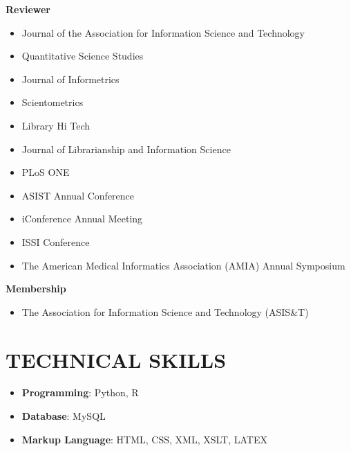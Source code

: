 \documentclass[margin, 10pt]{res} %
\begin{document}
\begin{resume}
\textbf{Reviewer}
\begin{itemize}
\item Journal of the Association for Information Science and Technology
\item Quantitative Science Studies
\item Journal of Informetrics
\item Scientometrics
\item Library Hi Tech
\item Journal of Librarianship and Information Science
\item PLoS ONE
\item ASIST Annual Conference
\item iConference Annual Meeting
\item ISSI Conference
\item The American Medical Informatics Association (AMIA) Annual Symposium
\end{itemize}

\textbf{Membership}
\begin{itemize}
\item The Association for Information Science and Technology (ASIS\&T)
\end{itemize}

\section{TECHNICAL SKILLS}
\begin{itemize}
\item \textbf{Programming}: Python, R
\item \textbf{Database}: MySQL
\item \textbf{Markup Language}: HTML, CSS, XML, XSLT, LATEX
\end{itemize}



\end{resume}
\end{document}
